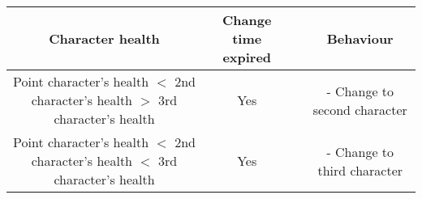\documentclass{article}
\begin{document}
\begin{landscape}

\begin{table}[h!]
  \begin{center}
    \begin{tabular*}{22cm}{c|c|c|c}
      \textbf{Character health} & \textbf{Change time expired} & \textbf{} & \textbf{Behaviour}\\
      \hline
      Point character's health $<$ 2nd character's health $>$ 3rd character's health & Yes & & - Change to second character\\
      \hline
      Point character's health $<$ 2nd character's health $<$ 3rd character's health & Yes & & - Change to third character\\
      \hline
        \end{tabular*}
  \end{center}
\end{table}

\end{landscape}

\newpage
\end{document}
